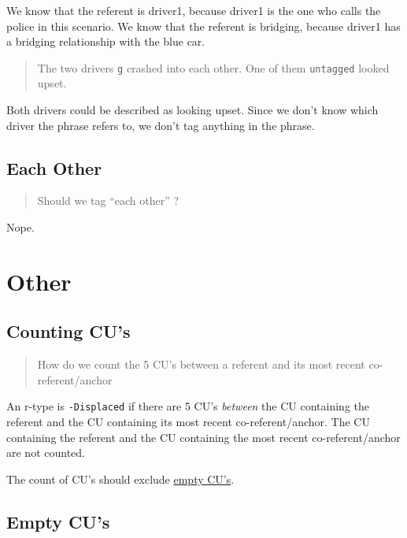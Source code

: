\documentclass[
]{book}
\begin{document}
We know that the referent is driver1, because driver1 is the one who calls the police in this scenario.
We know that the referent is bridging, because driver1 has a bridging relationship with the blue car.

\begin{quote}
The two drivers \texttt{g} crashed into each other.
One of them \texttt{untagged} looked upset.
\end{quote}

Both drivers could be described as looking upset.
Since we don't know which driver the phrase refers to, we don't tag anything in the phrase.

\hypertarget{each-other}{%
\subsection{Each Other}\label{each-other}}

\begin{quote}
Should we tag ``each other'' ?
\end{quote}

Nope.

\hypertarget{other}{%
\section{Other}\label{other}}

\hypertarget{counting-cus}{%
\subsection{Counting CU's}\label{counting-cus}}

\begin{quote}
How do we count the 5 CU's between a referent and its most recent co-referent/anchor
\end{quote}

An r-type is \texttt{-Displaced} if there are 5 CU's \emph{between} the CU containing the referent and the CU containing its most recent co-referent/anchor.
The CU containing the referent and the CU containing the most recent co-referent/anchor are not counted.

The count of CU's should exclude \href{empty-cu's}{empty CU's}.

\hypertarget{empty-cus}{%
\subsection{Empty CU's}\label{empty-cus}}
\end{document}
